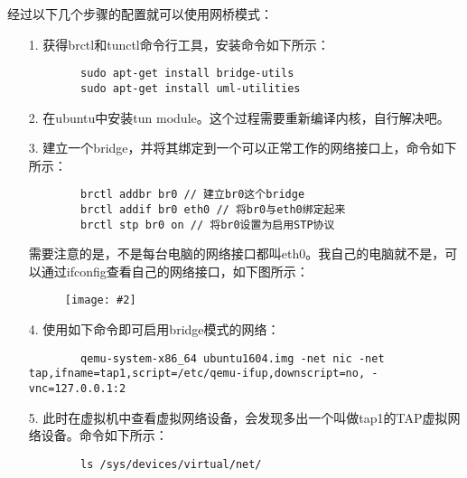 \documentclass[a4paper,left=2.5cm,right=2.5cm,11pt]{article}
\newcommand{\sizedfic}[2]{\begin{figure}[H]
		\center
		\texttt{[image: \#2]}
	\end{figure}}
\begin{document}
	经过以下几个步骤的配置就可以使用网桥模式：
	\begin{itemize}
		\item[1.] 获得brctl和tunctl命令行工具，安装命令如下所示：
		\begin{lstlisting}
		sudo apt-get install bridge-utils
		sudo apt-get install uml-utilities
		\end{lstlisting}

		\item[2.] 在ubuntu中安装tun module。这个过程需要重新编译内核，自行解决吧。
		\item[3.] 建立一个bridge，并将其绑定到一个可以正常工作的网络接口上，命令如下所示：
		\begin{lstlisting}
		brctl addbr br0 // 建立br0这个bridge
		brctl addif br0 eth0 // 将br0与eth0绑定起来
		brctl stp br0 on // 将br0设置为启用STP协议
		\end{lstlisting}

		需要注意的是，不是每台电脑的网络接口都叫eth0。我自己的电脑就不是，可以通过ifconfig查看自己的网络接口，如下图所示：
		\sizedfic{0.9}{10.png}

		\item[4.] 使用如下命令即可启用bridge模式的网络：
		\begin{lstlisting}
		qemu-system-x86_64 ubuntu1604.img -net nic -net tap,ifname=tap1,script=/etc/qemu-ifup,downscript=no, -vnc=127.0.0.1:2
		\end{lstlisting}

		\item[5.] 此时在虚拟机中查看虚拟网络设备，会发现多出一个叫做tap1的TAP虚拟网络设备。命令如下所示：
		\begin{lstlisting}
		ls /sys/devices/virtual/net/
		\end{lstlisting}
		
	\end{itemize}
\end{document}

